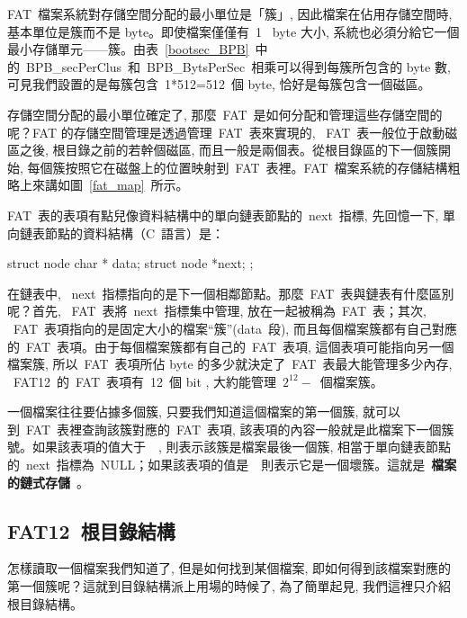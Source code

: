 
FAT~檔案系統對存儲空間分配的最小單位是「簇」, 因此檔案在佔用存儲空間時, 基本單位是簇而不是 byte。即使檔案僅僅有~1~ byte 大小, 系統也必須分給它一個最小存儲單元——簇。由表~\ref{bootsec_BPB}~中的~BPB\_secPerClus~和~BPB\_BytsPerSec~相乘可以得到每簇所包含的 byte 數, 可見我們設置的是每簇包含~1*512=512~個 byte, 恰好是每簇包含一個磁區。



存儲空間分配的最小單位確定了, 那麼~FAT~是如何分配和管理這些存儲空間的呢？FAT
的存儲空間管理是透過管理~FAT~表來實現的, ~FAT~表一般位于啟動磁區之後, 根目錄之前的若幹個磁區, 而且一般是兩個表。從根目錄區的下一個簇開始, 每個簇按照它在磁盤上的位置映射到~FAT~表裡。FAT~檔案系統的存儲結構粗略上來講如圖~\ref{fat_map}~所示。


FAT~表的表項有點兒像資料結構中的單向鏈表節點的~next~指標, 先回憶一下, 單向鏈表節點的資料結構（C~語言）是：

\begin{Command}
struct node {
  char * data;
  struct node *next;
};
\end{Command}
在鏈表中, ~next~指標指向的是下一個相鄰節點。那麼~FAT~表與鏈表有什麼區別呢？首先, ~FAT~表將~next~指標集中管理, 放在一起被稱為~FAT~表；其次, ~FAT~表項指向的是固定大小的檔案“簇”(data~段), 而且每個檔案簇都有自己對應的~FAT~表項。由于每個檔案簇都有自己的~FAT~表項, 這個表項可能指向另一個檔案簇, 所以~FAT~表項所佔 byte 的多少就決定了~FAT~表最大能管理多少內存, ~FAT12~的~FAT~表項有~12~個 bit , 大約能管理~$2^{12}-$~個檔案簇。

一個檔案往往要佔據多個簇, 只要我們知道這個檔案的第一個簇, 就可以到~FAT~表裡查詢該簇對應的~FAT~表項, 該表項的內容一般就是此檔案下一個簇號。如果該表項的值大于~~, 則表示該簇是檔案最後一個簇, 相當于單向鏈表節點的~next~指標為~NULL；如果該表項的值是~~則表示它是一個壞簇。這就是~\textbf{檔案的鏈式存儲}~。

\subsection{FAT12~根目錄結構}

怎樣讀取一個檔案我們知道了, 但是如何找到某個檔案, 即如何得到該檔案對應的第一個簇呢？這就到目錄結構派上用場的時候了, 為了簡單起見, 我們這裡只介紹根目錄結構。

